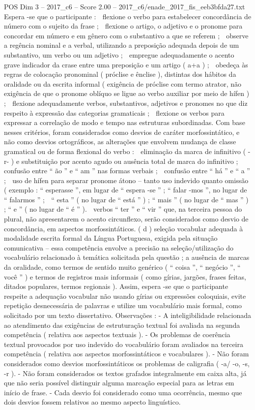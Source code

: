 \begin{textsample}{POS Dim 3 – 2017\_c6 – Score 2.00 – 2017\_c6/enade\_2017\_fis\_eeb3bfda27.txt}
Espera -se que o participante :  flexione o verbo para estabelecer concordância de número com o sujeito da frase ;  flexione o artigo, o adjetivo e o pronome para concordar em número e em gênero com o substantivo a que se referem ;  observe a regência nominal e a verbal, utilizando a preposição adequada depois de um substantivo, um verbo ou um adjetivo ;  empregue adequadamente o acento grave indicador da crase entre uma preposição e um artigo ( a+a ) ;  obedeça às regras de colocação pronominal ( próclise e ênclise ), distintas dos hábitos da oralidade ou da escrita informal ( exigência de próclise com termo atrator, não exigência de que o pronome oblíquo se ligue ao verbo auxiliar por meio de hífen ) ;  flexione adequadamente verbos, substantivos, adjetivos e pronomes no que diz respeito à expressão das categorias gramaticais ;  flexione os verbos para expressar a correlação de modo e tempo nas estruturas subordinadas.
Com base nesses critérios, foram considerados como desvios de caráter morfossintático, e não como desvios ortográficos, as alterações que envolvem mudança de classe gramatical ou de forma flexional do verbo :  eliminação da marca de infinitivo ( -r- ) e substituição por acento agudo ou ausência total de marca do infinitivo ;  confusão entre “ ão ” e “ am ” nas formas verbais ;  confusão entre “ há ” e “ a ” ;  uso de hífen para separar pronome átono – tanto uso indevido quanto omissão ( exemplo : “ esperasse ”, em lugar de “ espera -se ” ; “ falar -mos ”, no lugar de “ falarmos ” ;  “ esta ” ( no lugar de “ está ” ) ; “ mais ” ( no lugar de “ mas ” ) ; “ e ” ( no lugar de “ é ” ).  verbos “ ter ” e “ vir ” que, na terceira pessoa do plural, não apresentarem o acento circunflexo, serão considerados como desvio de concordância, em aspectos morfossintáticos. ( d ) seleção vocabular adequada à modalidade escrita formal da Língua Portuguesa, exigida pela situação comunicativa – essa competência envolve a precisão na seleção/utilização do vocabulário relacionado à temática solicitada pela questão ; a ausência de marcas da oralidade, como termos de sentido muito genérico ( “ coisa ”, “ negócio ”, “ você ” ) e termos de registros mais informais ( como gírias, jargões, frases feitas, ditados populares, termos regionais ).
Assim, espera -se que o participante respeite a adequação vocabular não usando gírias ou expressões coloquiais, evite repetição desnecessária de palavras e utilize um vocabulário mais formal, como solicitado por um texto dissertativo.
Observações : - A inteligibilidade relacionada ao atendimento das exigências de estruturação textual foi avaliada na segunda competência ( relativa aos aspectos textuais ). - Os problemas de coerência textual provocados por uso indevido do vocabulário foram avaliados na terceira competência ( relativa aos aspectos morfossintáticos e vocabulares ). - Não foram considerados como desvios morfossintáticos os problemas de caligrafia ( -a/ -o, -s, -r ). - Não foram considerados os textos grafados integralmente em caixa alta, já que não seria possível distinguir alguma marcação especial para as letras em início de frase. - Cada desvio foi considerado como uma ocorrência, mesmo que dois desvios fossem relativos ao mesmo aspecto linguístico.

\end{textsample}
